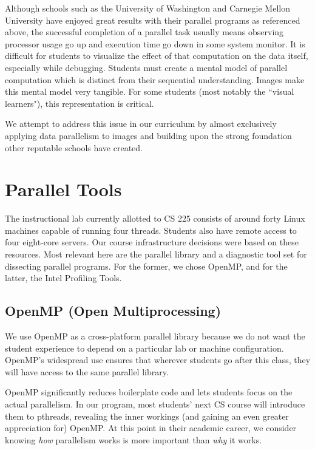 \documentclass[conference]{./IEEEtran}
\begin{document}
Although schools such as the University of Washington and Carnegie Mellon
University have enjoyed great results with their parallel programs
\cite{uwash:2013} as referenced above, the successful completion of a parallel
task usually means observing processor usage go up and execution time go down in
some system monitor. It is  difficult for students to visualize the effect of
that computation on the data itself, especially while debugging.  Students must
create a mental model of parallel computation which is distinct from their
sequential understanding. Images make this mental model very tangible.   For
some students (most notably the ``visual learners"), this representation is
critical.

We attempt to address this issue in our curriculum by almost exclusively
applying data parallelism to images and building upon the strong foundation
other reputable schools have created.

\section{Parallel Tools}

The instructional lab currently allotted to CS 225 consists of around forty
Linux machines capable of running four threads. Students also have remote access
to four eight-core servers.  Our course infrastructure decisions were based on
these resources. Most relevant here are the parallel library and a diagnostic
tool set for dissecting parallel programs.  For the former, we chose OpenMP, and
for the latter, the Intel Profiling Tools.

\subsection{OpenMP (Open Multiprocessing)}

We use OpenMP as a cross-platform parallel library because we do not want the
student experience to depend on a particular lab or machine configuration.
OpenMP's widespread use ensures that wherever students go after this class, they
will have access to the same parallel library.

OpenMP significantly reduces boilerplate code and lets students focus on the
actual parallelism. In our program, most students' next CS course will
introduce them  to pthreads, revealing the inner workings (and gaining an even
greater appreciation for) OpenMP. At this point in their academic career, we
consider knowing \emph{how} parallelism works is more important than \emph{why}
it works.
\end{document}
